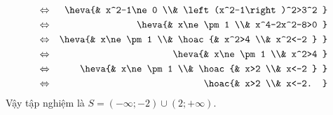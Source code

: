 \begin{ex}
{\begin{enumerate}
\begin{eqnarray*}
			&\Leftrightarrow& \heva{& x^2-1\ne 0 \\& \left(x^2-1\right)^2>3^2 } \\ 
			&\Leftrightarrow& \heva{& x\ne \pm 1 \\& x^4-2x^2-8>0  } \\
			&\Leftrightarrow& \heva{& x\ne \pm 1 \\& \hoac{& x^2>4 \\& x^2<-2  } } \\
			&\Leftrightarrow& \heva{&  x\ne \pm 1 \\& x^2>4 } \\
			&\Leftrightarrow& \heva{& x\ne \pm 1 \\& \hoac{&  x>2 \\& x<-2 } } \\
			&\Leftrightarrow& \hoac{& x>2  \\& x<-2. }
		\end{eqnarray*}
		 Vậy tập nghiệm là $S=\left(-\infty;-2\right)\cup\left(2;+\infty\right)$.
	\end{enumerate}
	 }
\end{ex}

